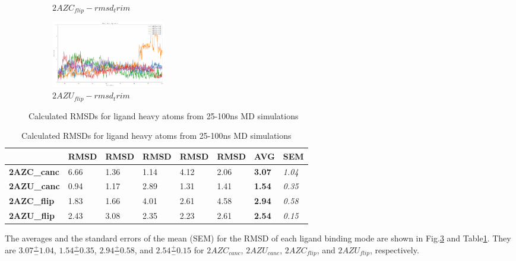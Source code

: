 \documentclass[fleqn,10pt]{wlscirep}
\begin{document}
\begin{figure}[!ht]
\begin{subfigure}{.45\textwidth}
     \caption{$2AZC_{flip}-rmsd_trim$}
     \label{fig:2AZC_flip-rmsd_trim}
   \end{subfigure}
    \begin{subfigure}{.45\textwidth}
     \centering
     \includegraphics[width=.95\linewidth]{2AZU_flip/2AZU_flip-rmsd-trim}
     \caption{$2AZU_{flip}-rmsd_trim$}
     \label{fig:2AZU_flip-rmsd_trim}
   \end{subfigure}
\caption{Calculated RMSDs for ligand heavy atoms from 25-100ns MD simulations}
\label{fig:rmsd}
\end{figure}  

\begin{table}[!ht]
\caption{Calculated RMSDs for ligand heavy atoms from 25-100ns MD simulations}
\label{table:rmsd}
\begin{tabular}{|l|l|l|l|l|l|l|l|}
\hline
                    & RMSD & RMSD & RMSD & RMSD & RMSD & \textbf{AVG}  & SEM           \\ \hline
\textbf{2AZC\_canc} & 6.66 & 1.36 & 1.14 & 4.12 & 2.06 & \textbf{3.07} & \textit{1.04} \\ \hline
\textbf{2AZU\_canc} & 0.94 & 1.17 & 2.89 & 1.31 & 1.41 & \textbf{1.54} & \textit{0.35} \\ \hline
\textbf{2AZC\_flip} & 1.83 & 1.66 & 4.01 & 2.61 & 4.58 & \textbf{2.94} & \textit{0.58} \\ \hline
\textbf{2AZU\_flip} & 2.43 & 3.08 & 2.35 & 2.23 & 2.61 & \textbf{2.54} & \textit{0.15} \\ \hline

\end{tabular}
\end{table}

The averages and the standard errors of the mean (SEM) for the RMSD of each ligand binding mode are shown in Fig.\ref{fig:rmsd} and Table\ref{table:rmsd}.
They are $3.07 \frac{+}{-} 1.04$, $1.54 \frac{+}{-} 0.35$, $2.94 \frac{+}{-} 0.58$, and $2.54 \frac{+}{-} 0.15$ for $2AZC_{canc}$, $2AZU_{canc}$, $2AZC_{flip}$, and $2AZU_{flip}$, respectively.
\end{document}
